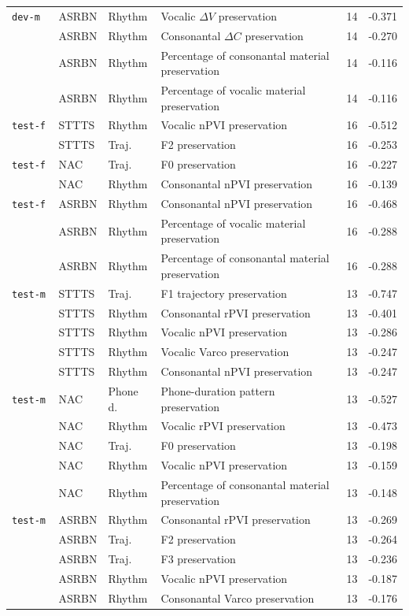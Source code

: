 \documentclass[12pt,leqno,a4paper]{article}
\begin{document}
\begin{longtable}{p{1.2cm}p{1.2cm}p{1.3cm}p{7.2cm}cc}
\hline
\texttt{dev-m} & ASRBN & Rhythm & Vocalic $\Delta V$ preservation & 14 & -0.371 \\
 & ASRBN & Rhythm & Consonantal $\Delta C$ preservation & 14 & -0.270 \\
 & ASRBN & Rhythm & Percentage of consonantal material preservation & 14 & -0.116 \\
 & ASRBN & Rhythm & Percentage of vocalic material preservation & 14 & -0.116 \\

\hline
\texttt{test-f} & STTTS & Rhythm & Vocalic nPVI preservation & 16 & -0.512 \\
 & STTTS & Traj. & F2 preservation & 16 & -0.253 \\
 
\hline
\texttt{test-f} & NAC & Traj. & F0 preservation  & 16 & -0.227 \\
 & NAC & Rhythm & Consonantal nPVI preservation & 16 & -0.139 \\

\hline
\texttt{test-f} & ASRBN & Rhythm & Consonantal nPVI preservation & 16 & -0.468 \\
 & ASRBN & Rhythm & Percentage of vocalic material preservation & 16 & -0.288 \\
 & ASRBN & Rhythm & Percentage of consonantal material preservation & 16 & -0.288 \\

\hline
\texttt{test-m} & STTTS & Traj. & F1 trajectory preservation & 13 & -0.747 \\
 & STTTS & Rhythm & Consonantal rPVI preservation & 13 & -0.401 \\
 & STTTS & Rhythm & Vocalic nPVI preservation & 13 & -0.286 \\
 & STTTS & Rhythm & Vocalic Varco preservation & 13 & -0.247 \\
 & STTTS & Rhythm & Consonantal nPVI preservation & 13 & -0.247 \\

\hline
\texttt{test-m }& NAC & Phone d. & Phone-duration pattern preservation & 13 & -0.527 \\
 & NAC & Rhythm & Vocalic rPVI preservation  & 13 & -0.473 \\
 & NAC & Traj. & F0  preservation & 13 & -0.198 \\
 & NAC & Rhythm & Vocalic nPVI preservation & 13 & -0.159 \\
 & NAC & Rhythm & Percentage of consonantal material preservation& 13 & -0.148 \\

\hline
\texttt{test-m} & ASRBN & Rhythm & Consonantal rPVI preservation & 13 & -0.269 \\
 & ASRBN & Traj. & F2  preservation & 13 & -0.264 \\
 & ASRBN & Traj. & F3 preservation & 13 & -0.236 \\
 & ASRBN & Rhythm & Vocalic nPVI preservation & 13 & -0.187 \\
 & ASRBN & Rhythm & Consonantal Varco preservation & 13 & -0.176 \\

\end{longtable}
\endgroup
\end{document}
